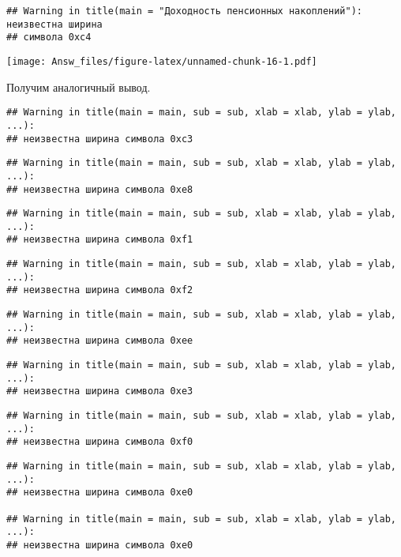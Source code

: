 \documentclass[,]{article}
\begin{document}
\begin{verbatim}
## Warning in title(main = "Доходность пенсионных накоплений"): неизвестна ширина
## символа 0xc4
\end{verbatim}

\texttt{[image: Answ\_files/figure-latex/unnamed-chunk-16-1.pdf]}

Получим аналогичный вывод.

\begin{verbatim}
## Warning in title(main = main, sub = sub, xlab = xlab, ylab = ylab, ...):
## неизвестна ширина символа 0xc3
\end{verbatim}

\begin{verbatim}
## Warning in title(main = main, sub = sub, xlab = xlab, ylab = ylab, ...):
## неизвестна ширина символа 0xe8
\end{verbatim}

\begin{verbatim}
## Warning in title(main = main, sub = sub, xlab = xlab, ylab = ylab, ...):
## неизвестна ширина символа 0xf1
\end{verbatim}

\begin{verbatim}
## Warning in title(main = main, sub = sub, xlab = xlab, ylab = ylab, ...):
## неизвестна ширина символа 0xf2
\end{verbatim}

\begin{verbatim}
## Warning in title(main = main, sub = sub, xlab = xlab, ylab = ylab, ...):
## неизвестна ширина символа 0xee
\end{verbatim}

\begin{verbatim}
## Warning in title(main = main, sub = sub, xlab = xlab, ylab = ylab, ...):
## неизвестна ширина символа 0xe3
\end{verbatim}

\begin{verbatim}
## Warning in title(main = main, sub = sub, xlab = xlab, ylab = ylab, ...):
## неизвестна ширина символа 0xf0
\end{verbatim}

\begin{verbatim}
## Warning in title(main = main, sub = sub, xlab = xlab, ylab = ylab, ...):
## неизвестна ширина символа 0xe0

## Warning in title(main = main, sub = sub, xlab = xlab, ylab = ylab, ...):
## неизвестна ширина символа 0xe0
\end{verbatim}
\end{document}
